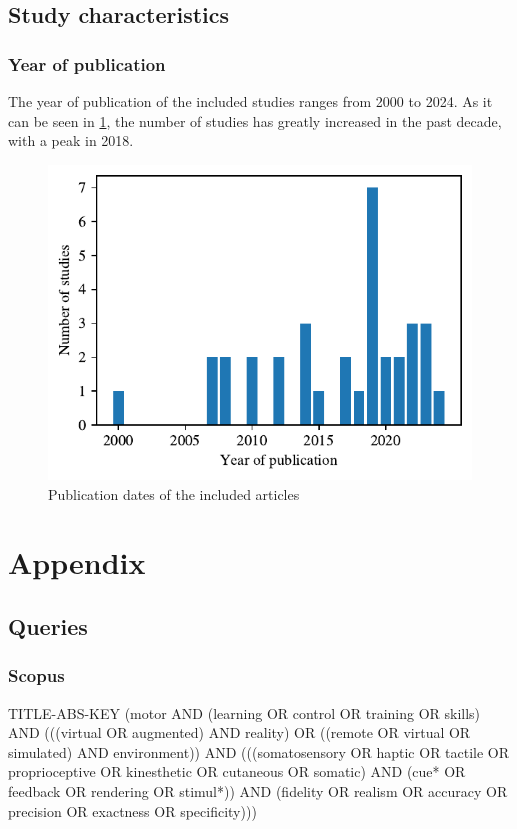 \documentclass[conference]{IEEEtran}
\begin{document}
\subsection{Study characteristics}

\subsubsection{Year of publication}
The year of publication of the included studies ranges from 2000 to 2024. As it can be seen in \ref{fig:years}, the number of studies has greatly increased in the past decade, with a peak in 2018.

\begin{figure}[ht]
    \centering
    \includegraphics[width=\columnwidth]{years.pdf} 
    \caption{Publication dates of the included articles}
    \label{fig:years}
\end{figure}


\newpage
\section*{Appendix}

\subsection{Queries}
\label{sec:queries}

\subsubsection{Scopus}
TITLE-ABS-KEY (motor AND (learning OR control OR training OR skills) AND (((virtual OR augmented) AND reality) OR ((remote OR virtual OR simulated) AND environment)) AND (((somatosensory OR haptic OR tactile OR proprioceptive OR kinesthetic OR cutaneous OR somatic) AND (cue* OR feedback OR rendering OR stimul*)) AND (fidelity OR realism OR accuracy OR precision OR exactness OR specificity)))
\end{document}
